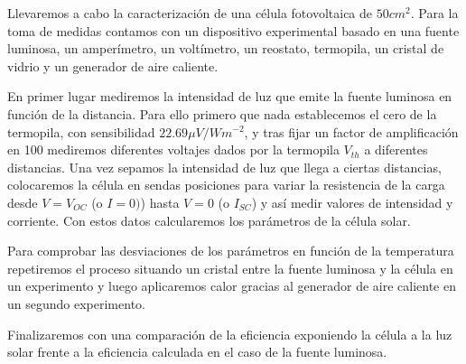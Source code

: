 Llevaremos a cabo la caracterización de una célula fotovoltaica de $50cm^2$. Para la toma de medidas contamos con un dispositivo experimental basado en una fuente luminosa, un amperímetro, un voltímetro, un reostato, termopila, un cristal de vidrio y un generador de aire caliente.

En primer lugar mediremos la intensidad de luz que emite la fuente luminosa en función de la distancia. Para ello primero que nada establecemos el cero de la termopila, con sensibilidad $22.69 \mu V/Wm^{-2}$, y tras fijar un factor de amplificación en 100 mediremos diferentes voltajes dados por la termopila $V_{th}$ a diferentes distancias. Una vez sepamos la intensidad de luz que llega a ciertas distancias, colocaremos la célula en sendas posiciones para variar la resistencia de la carga desde $V = V_{OC}$ (o $I = 0)$) hasta $V=0$ (o $I_{SC}$) y así medir valores de intensidad y corriente. Con estos datos calcularemos los parámetros de la célula solar.

Para comprobar las desviaciones de los parámetros en función de la temperatura repetiremos el proceso situando un cristal entre la fuente luminosa y la célula en un experimento y luego aplicaremos calor gracias al generador de aire caliente en un segundo experimento.

Finalizaremos con una comparación de la eficiencia exponiendo la célula a la luz solar frente a la eficiencia calculada en el caso de la fuente luminosa.